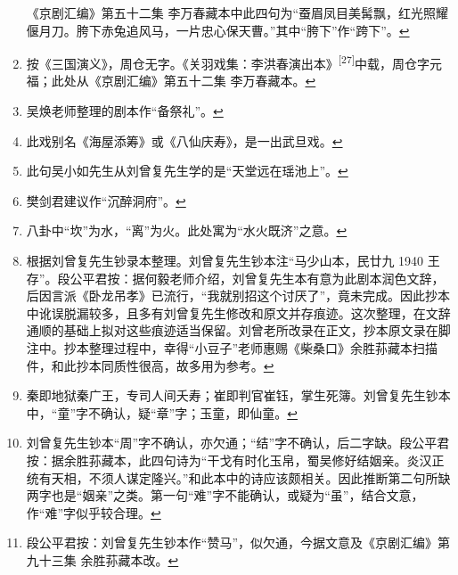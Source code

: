 \begin{enumerate}
  《京剧汇编》第五十二集
  李万春藏本中此四句为``蚕眉凤目美髯飘，红光照耀偃月刀。胯下赤兔追风马，一片忠心保天曹。''其中``胯下''作``跨下''。\protect\hyperlink{fnref629}{↩}
\item
  \leavevmode\hypertarget{fn630}{}%
  按《三国演义》，周仓无字。《关羽戏集：李洪春演出本》\textsuperscript{{[}27{]}}中载，周仓字元福；此处从《京剧汇编》第五十二集
  李万春藏本。\protect\hyperlink{fnref630}{↩}
\item
  \leavevmode\hypertarget{fn631}{}%
  吴焕老师整理的剧本作``备祭礼''。\protect\hyperlink{fnref631}{↩}
\item
  \leavevmode\hypertarget{fn632}{}%
  此戏别名《海屋添筹》或《八仙庆寿》，是一出武旦戏。\protect\hyperlink{fnref632}{↩}
\item
  \leavevmode\hypertarget{fn633}{}%
  此句吴小如先生从刘曾复先生学的是``天堂远在瑶池上''。\protect\hyperlink{fnref633}{↩}
\item
  \leavevmode\hypertarget{fn634}{}%
  樊剑君建议作``沉醉洞府''。\protect\hyperlink{fnref634}{↩}
\item
  \leavevmode\hypertarget{fn635}{}%
  八卦中``坎''为水，``离''为火。此处寓为``水火既济''之意。\protect\hyperlink{fnref635}{↩}
\item
  \leavevmode\hypertarget{fn636}{}%
  根据刘曾复先生钞录本整理。刘曾复先生钞本注``马少山本，民廿九 1940
  王存''。段公平君按：据何毅老师介绍，刘曾复先生本有意为此剧本润色文辞，后因言派《卧龙吊孝》已流行，``我就别招这个讨厌了''，竟未完成。因此抄本中讹误脱漏较多，且多有刘曾复先生修改和原文并存痕迹。这次整理，在文辞通顺的基础上拟对这些痕迹适当保留。刘曾老所改录在正文，抄本原文录在脚注中。抄本整理过程中，幸得``小豆子''老师惠赐《柴桑口》余胜荪藏本扫描件，和此抄本同质性很高，故多用为参考。\protect\hyperlink{fnref636}{↩}
\item
  \leavevmode\hypertarget{fn637}{}%
  秦即地狱秦广王，专司人间夭寿；崔即判官崔钰，掌生死簿。刘曾复先生钞本中，``童''字不确认，疑``章''字；玉童，即仙童。\protect\hyperlink{fnref637}{↩}
\item
  \leavevmode\hypertarget{fn638}{}%
  刘曾复先生钞本``周''字不确认，亦欠通；``结''字不确认，后二字缺。段公平君按：据余胜荪藏本，此四句诗为``干戈有时化玉帛，蜀吴修好结姻亲。炎汉正统有天相，不须人谋定隆兴。''和此本中的诗应该颇相关。因此推断第二句所缺两字也是``姻亲''之类。第一句``难''字不能确认，或疑为``虽''，结合文意，作``难''字似乎较合理。\protect\hyperlink{fnref638}{↩}
\item
  \leavevmode\hypertarget{fn639}{}%
  段公平君按：刘曾复先生钞本作``赞马''，似欠通，今据文意及《京剧汇编》第九十三集
  余胜荪藏本改。\protect\hyperlink{fnref639}{↩}

\end{enumerate}
